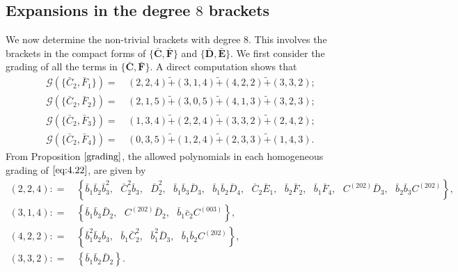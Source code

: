 \documentclass[10pt]{amsart}
\theoremstyle{definition}
\theoremstyle{corollary}
\theoremstyle{remark}
\theoremstyle{conclusion}
\begin{document}
\vskip 0.5cm

\subsection{Expansions in the degree $8$ brackets}

\label{subsec4.3}

We now determine the non-trivial brackets with degree $8.$ This involves the brackets in the compact forms of $\{\bar{\textbf{C}},\bar{\textbf{F}}\}$ and $\{\bar{\textbf{D}},\bar{\textbf{E}}\}.$ We first consider the grading of all the terms in $\{\bar{\textbf{C}},\bar{\textbf{F}}\}.$ A direct computation shows that \begin{align}
    \mathcal{G} \left(\{\bar{C}_2,\bar{F}_1\}\right) = & \, (2,2,4) \tilde{+} (3,1,4) \tilde{+}   (4,2,2)  \tilde{+}   (3,3,2) \label{eq:4.22} ; \\
       \mathcal{G} \left(\{\bar{C}_2,\bar{F}_2\}\right) = & \, (2,1,5) \tilde{+} (3,0,5) \tilde{+}    (4,1,3) \tilde{+}     (3,2,3)  \label{eq:4.23} ;\\ 
       \mathcal{G} \left(\{\bar{C}_2,\bar{F}_3\}\right) = & \, (1,3,4) \tilde{+} (2,2,4) \tilde{+}     (3,3,2)\tilde{+}  (2,4,2) \label{eq:4.24}; \\
       \mathcal{G} \left(\{\bar{C}_2,\bar{F}_4\}\right) = & \, (0,3,5) \tilde{+} (1,2,4) \tilde{+}    (2,3,3)  \tilde{+}   (1,4,3) \label{eq:4.25}.
\end{align} From Proposition $\ref{grading}$, the allowed polynomials in each homogeneous grading of $\eqref{eq:4.22}$, are given by \begin{align*}
    (2,2,4) : = & \, \left\{\bar{b}_1\bar{b}_2\bar{b}_3^2, \text{ }  \bar{C}_2^2 \bar{b}_3, \text{ }  \bar{D}_2^2, \text{ }  \bar{b}_1 \bar{b}_3\bar{D}_3, \text{ }  \bar{b}_1\bar{b}_2\bar{D}_4, \text{ }  \bar{C}_2\bar{E}_1, \text{ }  \bar{b}_2\bar{F}_2, \text{ }  \bar{b}_1\bar{F}_4, \text{ } C^{(202)}\bar{D}_3, \text{ } \bar{b}_2\bar{b}_3C^{(202)}   \right\} ,\\
    (3,1,4) : = & \, \left\{ \bar{b}_1\bar{b}_3 \bar{D}_2, \text{ } C^{(202)}\bar{D}_2, \text{ } \bar{b}_1 \bar{c}_2 C^{(003)}   \right\}  , \\
    (4,2,2) : = & \,  \left\{\bar{b}_1^2 \bar{b}_2\bar{b}_3, \text{ }  \bar{b}_1\bar{C}_2^2, \text{ }  \bar{b}_1^2\bar{D}_3  , \text{ } \bar{b}_1\bar{b}_2C^{(202)} \right\}  , \\
    (3,3,2) : = & \,  \left\{ \bar{b}_1\bar{b}_2\bar{D}_2\right\}. %

\end{align*}
\end{document}

